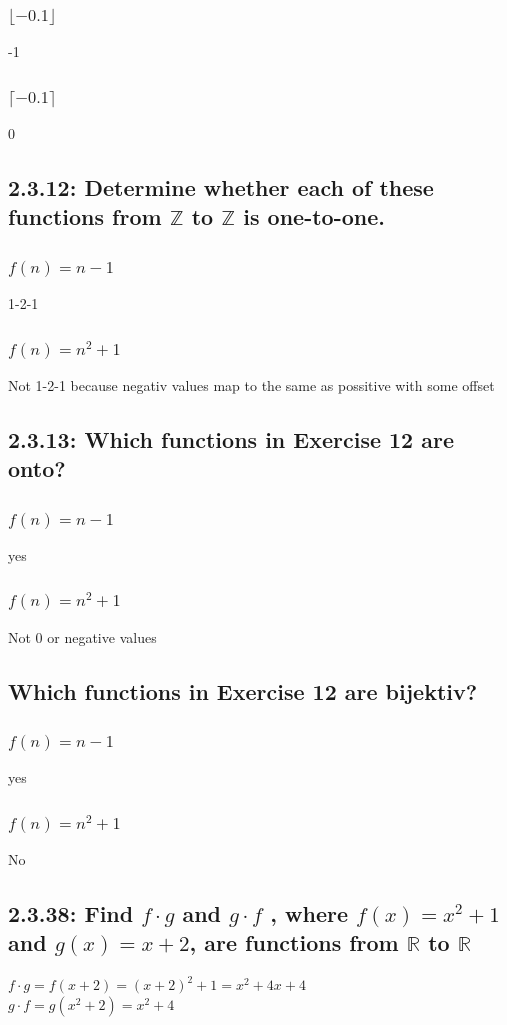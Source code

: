 \documentclass[12pt, a4paper]{report}
\begin{document}
					\subsubsection{$\lfloor -0.1 \rfloor$}
						-1
					\subsubsection{$\lceil -0.1 \rceil$}
						0
				\setcounter{subsection}{11}
				\subsection{2.3.12: Determine whether each of these functions from $\mathbb{Z}$ to $\mathbb{Z}$ is one-to-one.}
					\subsubsection{$f(n)=n-1$}
						1-2-1
					\subsubsection{$f(n)=n^2+1$}
						Not 1-2-1 because negativ values map to the same as possitive with some offset
				\subsection{2.3.13: Which functions in Exercise 12 are onto?}
					\subsubsection{$f(n)=n-1$}
						yes
					\subsubsection{$f(n)=n^2+1$}
						Not 0 or negative values
				\subsection{ Which functions in Exercise 12 are bijektiv?}
					\subsubsection{$f(n)=n-1$}
						yes
					\subsubsection{$f(n)=n^2+1$}
						No
				\setcounter{subsection}{37}
				\subsection{2.3.38: Find $f \cdot g$ and $g\cdot f$ , where $f (x) = x^2 + 1$ and $g(x) = x + 2$, are functions from $\mathbb{R}$ to $\mathbb{R}$}
					$f\cdot g = f(x+2) = (x+2)^2+1=x^2+4x+4$\\
					$g\cdot f=g(x^2+2)=x^2+4$
\end{document}
